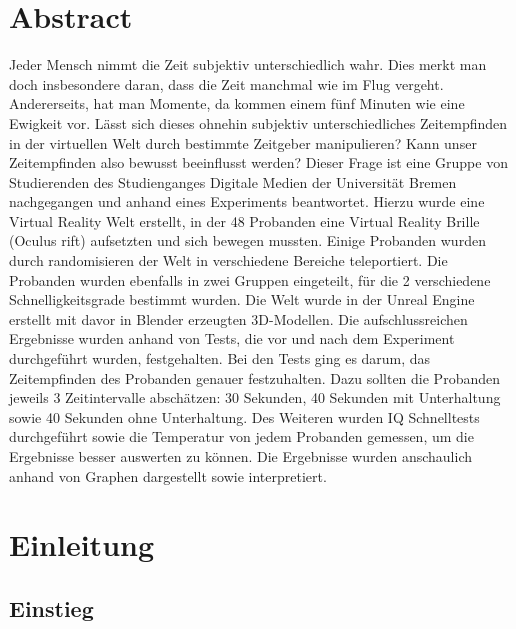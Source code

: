 \documentclass{Paper}
\begin{document}
\maketitle


\tableofcontents
\clearpage
	
\section{Abstract}

Jeder Mensch nimmt die Zeit subjektiv unterschiedlich wahr. Dies merkt man doch insbesondere daran, dass die Zeit manchmal wie im Flug vergeht. Andererseits, hat man Momente, da kommen einem fünf Minuten wie eine Ewigkeit vor. Lässt sich dieses ohnehin subjektiv unterschiedliches Zeitempfinden in der virtuellen Welt durch bestimmte Zeitgeber manipulieren? Kann unser Zeitempfinden also bewusst beeinflusst werden?  Dieser Frage ist eine Gruppe von Studierenden des Studienganges Digitale Medien der Universität Bremen nachgegangen und anhand eines Experiments beantwortet. Hierzu wurde eine Virtual Reality Welt erstellt, in der 48 Probanden eine Virtual Reality Brille (Oculus rift) aufsetzten und sich bewegen mussten.  Einige Probanden wurden durch randomisieren der Welt in verschiedene Bereiche teleportiert. Die Probanden wurden ebenfalls in zwei Gruppen eingeteilt, für die 2 verschiedene Schnelligkeitsgrade bestimmt wurden. Die Welt wurde in der Unreal Engine erstellt mit davor in Blender erzeugten 3D-Modellen.  Die aufschlussreichen Ergebnisse wurden anhand von Tests, die vor und nach dem Experiment durchgeführt wurden, festgehalten. Bei den Tests ging es darum, das Zeitempfinden des Probanden genauer festzuhalten. Dazu sollten die Probanden jeweils 3 Zeitintervalle abschätzen: 30 Sekunden, 40 Sekunden mit Unterhaltung sowie 40 Sekunden ohne Unterhaltung. Des Weiteren wurden IQ Schnelltests durchgeführt sowie die Temperatur von jedem Probanden gemessen, um die Ergebnisse besser auswerten zu können. Die Ergebnisse wurden anschaulich anhand von Graphen dargestellt sowie interpretiert.



\section{Einleitung}
\subsection{Einstieg}
\end{document}
